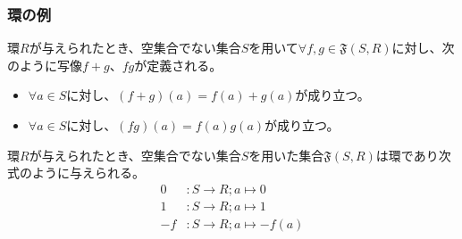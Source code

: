 \documentclass[dvipdfmx]{jsarticle}
\begin{document}
\subsubsection{環の例}
\begin{dfn}
環$R$が与えられたとき、空集合でない集合$S$を用いて$\forall f,g \in \mathfrak{F}(S,R)$に対し、次のように写像$f + g$、$fg$が定義される。
\begin{itemize}
\item
  $\forall a \in S$に対し、$(f + g)(a) = f(a) + g(a)$が成り立つ。
\item
  $\forall a \in S$に対し、$(fg)(a) = f(a)g(a)$が成り立つ。
\end{itemize}
\end{dfn}
\begin{thm}\label{3.3.1.4}
環$R$が与えられたとき、空集合でない集合$S$を用いた集合$\mathfrak{F}(S,R)$は環であり次式のように与えられる。
\begin{align*}
0&:S \rightarrow R;a \mapsto 0\\
1&:S \rightarrow R;a \mapsto 1\\
- f&:S \rightarrow R;a \mapsto - f(a)
\end{align*}
\end{thm}
\end{document}
